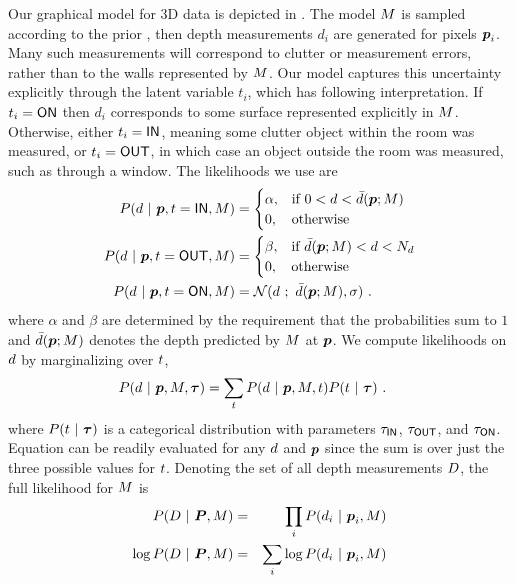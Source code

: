 Our graphical model for 3D data is depicted in . The
model $\Scene$ is sampled according to the prior ,
then depth measurements $d_i$ are generated for pixels
$\Pixel_i$. Many such measurements will correspond to clutter or
measurement errors, rather than to the walls represented by
$\Scene$. Our model captures this uncertainty explicitly through
the latent variable $t_i$, which has following interpretation. If
$t_i=\ON$ then $d_i$ corresponds to some surface represented
explicitly in $\Scene$. Otherwise, either $t_i=\IN$, meaning some
clutter object within the room was measured, or $t_i=\OUT$, in which
case an object outside the room was measured, such as through a
window. The likelihoods we use are
\begin{align}
  \label{eq:x-inside}
  P(\Depth~|~\Pixel,\Ind=\textsf{IN},\Scene) &=
  \begin{cases}
    \alpha, & \mbox{if } 0 < \Depth < \DepthAtPGivenModel \\
    0, & \mbox{otherwise} \\
  \end{cases} \\
  \label{eq:x-outside}
  P(d~|~\Pixel,\Ind=\textsf{OUT},\Scene) &=
  \begin{cases}
    \beta, & \mbox{if } \DepthAtPGivenModel < \Depth < \Dmax \\
    0, & \mbox{otherwise} \\
  \end{cases} \\
  P(\Depth ~|~ \Pixel,\Ind=\textsf{ON},\Scene) &=
  \NormalDistr(\Depth~;~\DepthAtPGivenModel,\sigma) ~.
\end{align}
where $\alpha$ and $\beta$ are determined by the requirement that the
probabilities sum to $1$ and $\DepthAtPGivenModel$ denotes the depth
predicted by $\Scene$ at $\Pixel$. We compute likelihoods on $\Depth$ by
marginalizing over $\Ind$,
\begin{align}
  \label{eq:3d-likelihood}
  P(\Depth~|~\Pixel,\Scene,\IndModel) &=
   \sum_{\Ind} P(\Depth~|~\Pixel,\Scene,\Ind) P(\Ind~|~\IndModel)
  ~.
\end{align}
where $P(\Ind~|~\IndModel)$ is a categorical distribution with
parameters $\tIN$, $\tOUT$, and $\tON$. Equation
 can be readily evaluated for any $\Depth$ and
$\Pixel$ since the sum is over just the three possible values for
$\Ind$. Denoting the set of all depth measurements $\Depths$, the full
likelihood for $\Scene$ is
\begin{eqnarray}
  \label{eq:depth-loglik}
  P(\Depths ~|~ \Pixels,\Scene) &=&
    \prod_i P(\Depth_i ~|~ \Pixel_i,\Scene)\\
  \log P(\Depths ~|~ \Pixels,\Scene) &=&
    \sum_i \log P(\Depth_i ~|~ \Pixel_i,\Scene)
\end{eqnarray}
